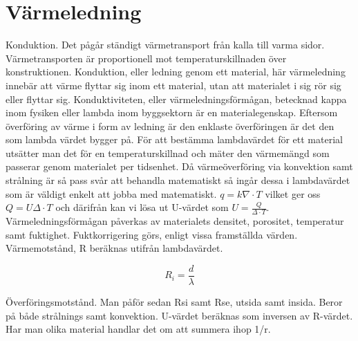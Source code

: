 \section{Värmeledning}\label{sec:heatconduction}
Konduktion. Det pågår ständigt värmetransport från kalla till varma sidor. Värmetransporten är proportionell mot temperaturskillnaden över konstruktionen. Konduktion, eller ledning genom ett material, här värmeledning innebär att värme flyttar sig inom ett material, utan att materialet i sig rör sig eller flyttar sig. Konduktiviteten, eller värmeledningsförmågan, betecknad kappa inom fysiken eller lambda inom byggsektorn är en materialegenskap. Eftersom överföring av värme i form av ledning är den enklaste överföringen är det den som lambda värdet bygger på. För att bestämma lambdavärdet för ett material utsätter man det för en temperaturskillnad och mäter den värmemängd som passerar genom materialet per tidsenhet. Då värmeöverföring via konvektion samt strålning är så pass svår att behandla matematiskt så ingår dessa i lambdavärdet som är väldigt enkelt att jobba med matematiskt. $q=k \nabla \cdot T$ vilket ger oss $Q=U \Delta \cdot T$ och därifrån kan vi lösa ut U-värdet som $U = \frac{Q}{\Delta\cdot T}$. Värmeledningsförmågan påverkas av materialets densitet, porositet, temperatur samt fuktighet. Fuktkorrigering görs, enligt vissa framställda värden. Värmemotstånd, R beräknas utifrån lambdavärdet.

\begin{equation}
R_i=\frac{d}{\lambda}
\end{equation}

Överföringsmotstånd. Man påför sedan Rsi samt Rse, utsida samt insida. Beror på både strålnings samt konvektion. U-värdet beräknas som inversen av R-värdet. Har man olika material handlar det om att summera ihop 1/r.
